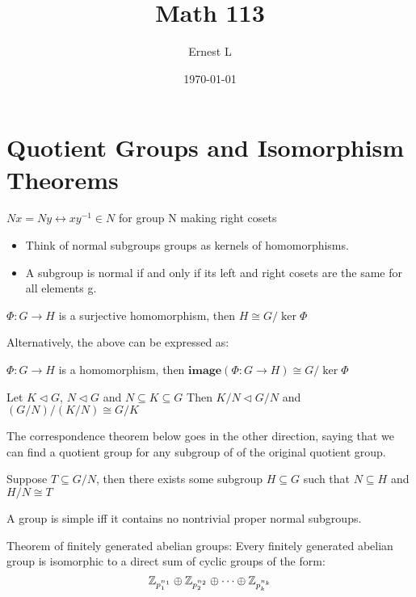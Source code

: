 \documentclass[11pt]{article}
\author{Ernest L}
\date{\today}
\title{Math 113}
\let\biconditional\leftrightarrow
\begin{document}
\maketitle
\section{Quotient Groups and Isomorphism Theorems}

    \begin{theorem}
        $Nx = Ny \biconditional xy^{-1} \in N$ for group N making right cosets
    \end{theorem}

    \begin{itemize}
        \item
        Think of normal subgroups groups as kernels of homomorphisms.
        \item 
        A subgroup is normal if and only if its left and right cosets are the same for all elements g.
    \end{itemize}

    \begin{theorem}
        $\Phi: G \to H$ is a surjective homomorphism, then $H \cong G/\ker \Phi$
    \end{theorem}
    Alternatively, the above can be expressed as:
    \begin{note}
    $\Phi: G \to H$ is a homomorphism, then $\textbf{image} (\Phi: G \to H) \cong G/\ker \Phi$
    \end{note}

    \begin{theorem}
        Let $K \triangleleft G$, $N \triangleleft G$ and $N \subseteq K \subseteq G$
        Then $K/N \triangleleft G/N$ and $(G/N)/(K/N) \cong G/K$
    \end{theorem}

    The correspondence theorem below goes in the other direction, saying that we can find a quotient group for any subgroup of of 
    the original quotient group.
    \begin{theorem}
        Suppose $T \subseteq G / N$, then there exists some subgroup $H \subseteq G$ such that $N \subseteq H$ and $H/N \cong T$
    \end{theorem}

    \begin{definition}
        A group is simple iff it contains no nontrivial proper normal subgroups.
    \end{definition}

    \begin{theorem}
        Theorem of finitely generated abelian groups: Every finitely generated abelian group is isomorphic to a direct sum of cyclic groups of the form:
        \[
            \mathbb{Z}_{p_1^{n_1}} \oplus \mathbb{Z}_{p_2^{n_2}} \oplus \cdots \oplus \mathbb{Z}_{p_k^{n_k}}
        \]
    \end{theorem}
\end{document}
